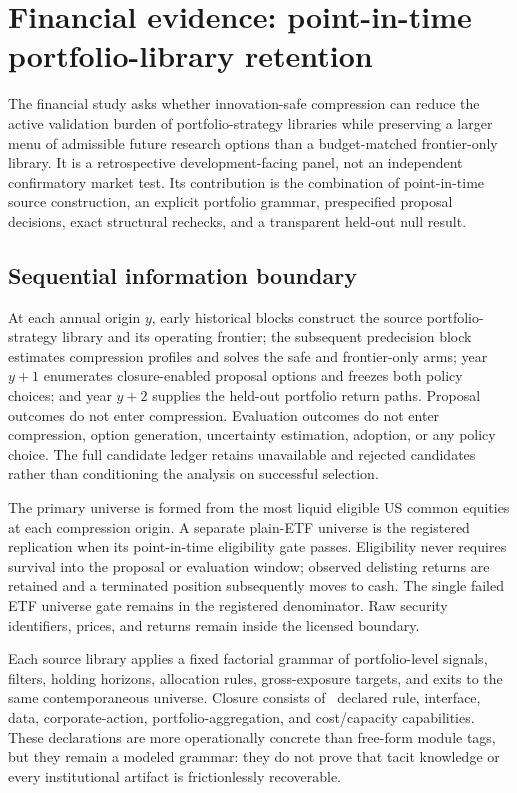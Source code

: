 \section{Financial evidence: point-in-time portfolio-library retention}
\label{sec:financial-case-studies}
\label{sec:financial-compression-audit}

The financial study asks whether innovation-safe compression can reduce the
active validation burden of portfolio-strategy libraries while preserving a
larger menu of admissible future research options than a budget-matched
frontier-only library. It is a retrospective development-facing panel, not an
independent confirmatory market test. Its contribution is the combination of
point-in-time source construction, an explicit portfolio grammar, prespecified
proposal decisions, exact structural rechecks, and a transparent held-out null
result.

\subsection{Sequential information boundary}

At each annual origin \(y\), early historical blocks construct the source
portfolio-strategy library and its operating frontier; the subsequent
predecision block estimates compression profiles and solves the safe and
frontier-only arms; year \(y+1\) enumerates closure-enabled proposal options and
freezes both policy choices; and year \(y+2\) supplies the held-out portfolio
return paths. Proposal outcomes do not enter compression. Evaluation outcomes
do not enter compression, option generation, uncertainty estimation, adoption,
or any policy choice. The full candidate ledger retains unavailable and
rejected candidates rather than conditioning the analysis on successful
selection.

The primary universe is formed from the most liquid eligible US common
equities at each compression origin. A separate plain-ETF universe is the
registered replication when its point-in-time eligibility gate passes.
Eligibility never requires survival into the proposal or evaluation window;
observed delisting returns are retained and a terminated position subsequently
moves to cash. The single failed ETF universe gate remains in the registered
denominator. Raw security identifiers, prices, and returns remain inside the
licensed boundary.

Each source library applies a fixed factorial grammar of portfolio-level
signals, filters, holding horizons, allocation rules, gross-exposure targets,
and exits to the same contemporaneous universe. Closure consists of
\AORPointInTimeCapabilities\ declared rule, interface, data, corporate-action,
portfolio-aggregation, and cost/capacity capabilities. These declarations are
more operationally concrete than free-form module tags, but they remain a
modeled grammar: they do not prove that tacit knowledge or every institutional
artifact is frictionlessly recoverable.

